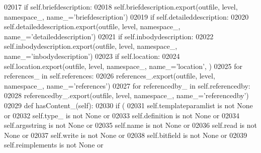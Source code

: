 \begin{DoxyCode}
{{{{{{{{{{{{{{{{{{{{{{{{{{{{{{{{{{{{{{{{{{{{{{{{{{{{{{{{{{{{{{{{{{{{{{{{{{{{{{{{{{{{{{{{{{{{{{{{{{{{{{{{{{{{{{{{{{{{{{{{{{{{{{{{{{{{{{{{{{{{{{{02017         \textcolor{keywordflow}{if} self.briefdescription:
02018             self.briefdescription.export(outfile, level, namespace\_, name\_=\textcolor{stringliteral}{'briefdescription'})
02019         \textcolor{keywordflow}{if} self.detaileddescription:
02020             self.detaileddescription.export(outfile, level, namespace\_, name\_=\textcolor{stringliteral}{'detaileddescription'})
02021         \textcolor{keywordflow}{if} self.inbodydescription:
02022             self.inbodydescription.export(outfile, level, namespace\_, name\_=\textcolor{stringliteral}{'inbodydescription'})
02023         \textcolor{keywordflow}{if} self.location:
02024             self.location.export(outfile, level, namespace\_, name\_=\textcolor{stringliteral}{'location'}, )
02025         \textcolor{keywordflow}{for} references\_ \textcolor{keywordflow}{in} self.references:
02026             references\_.export(outfile, level, namespace\_, name\_=\textcolor{stringliteral}{'references'})
02027         \textcolor{keywordflow}{for} referencedby\_ \textcolor{keywordflow}{in} self.referencedby:
02028             referencedby\_.export(outfile, level, namespace\_, name\_=\textcolor{stringliteral}{'referencedby'})
02029     \textcolor{keyword}{def }hasContent_(self):
02030         \textcolor{keywordflow}{if} (
02031             self.templateparamlist \textcolor{keywordflow}{is} \textcolor{keywordflow}{not} \textcolor{keywordtype}{None} \textcolor{keywordflow}{or}
02032             self.type_ \textcolor{keywordflow}{is} \textcolor{keywordflow}{not} \textcolor{keywordtype}{None} \textcolor{keywordflow}{or}
02033             self.definition \textcolor{keywordflow}{is} \textcolor{keywordflow}{not} \textcolor{keywordtype}{None} \textcolor{keywordflow}{or}
02034             self.argsstring \textcolor{keywordflow}{is} \textcolor{keywordflow}{not} \textcolor{keywordtype}{None} \textcolor{keywordflow}{or}
02035             self.name \textcolor{keywordflow}{is} \textcolor{keywordflow}{not} \textcolor{keywordtype}{None} \textcolor{keywordflow}{or}
02036             self.read \textcolor{keywordflow}{is} \textcolor{keywordflow}{not} \textcolor{keywordtype}{None} \textcolor{keywordflow}{or}
02037             self.write \textcolor{keywordflow}{is} \textcolor{keywordflow}{not} \textcolor{keywordtype}{None} \textcolor{keywordflow}{or}
02038             self.bitfield \textcolor{keywordflow}{is} \textcolor{keywordflow}{not} \textcolor{keywordtype}{None} \textcolor{keywordflow}{or}
02039             self.reimplements \textcolor{keywordflow}{is} \textcolor{keywordflow}{not} \textcolor{keywordtype}{None} \textcolor{keywordflow}{or}
}}}}}}}}}}}}}}}}}}}}}}}}}}}}}}}}}}}}}}}}}}}}}}}}}}}}}}}}}}}}}}}}}}}}}}}}}}}}}}}}}}}}}}}}}}}}}}}}}}}}}}}}}}}}}}}}}}}}}}}}}}}}}}}}}}}}}}}}}}}}}}}
\end{DoxyCode}
